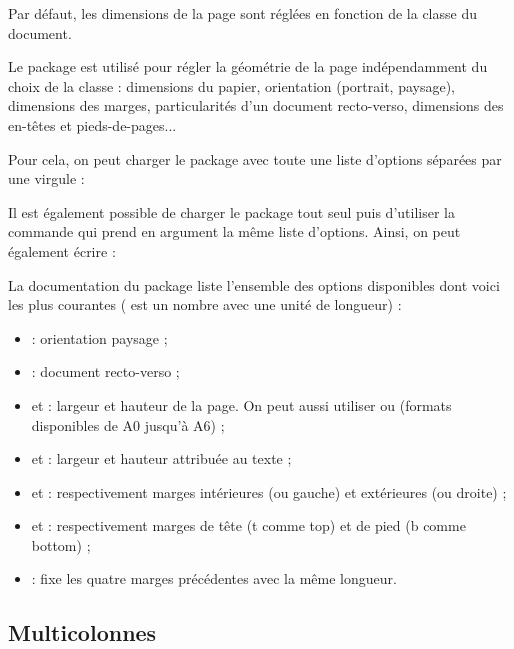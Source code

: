 Par défaut, les dimensions de la page sont réglées en fonction de la classe du document.\par
Le package  est utilisé pour régler la géométrie de la page indépendamment du choix de la classe : dimensions du papier, orientation (portrait, paysage), dimensions des marges, particularités d'un document recto-verso, dimensions des en-têtes et pieds-de-pages...

Pour cela, on peut charger le package avec toute une liste d'options séparées par une virgule :\par\medskip
{}\medskip

Il est également possible de charger le package tout seul puis d'utiliser la commande  qui prend en argument la même liste d'options. Ainsi, on peut également écrire :\par\medskip
{}\par
{}\medskip

La documentation du package  liste l'ensemble des options disponibles dont voici les plus courantes ( est un nombre avec une unité de longueur) :
\begin{itemize}
    \item {} : orientation paysage ;
    \item {} : document recto-verso ;
    \item {} et  : largeur et hauteur de la page. On peut aussi utiliser  ou  (formats disponibles de A0 jusqu'à A6) ;
    \item {} et  : largeur et hauteur attribuée au texte ;
    \item {} et  : respectivement marges intérieures (ou gauche) et extérieures (ou droite) ;
    \item {} et  : respectivement marges de tête (t comme top) et de pied (b comme bottom) ;
    \item {} : fixe les quatre marges précédentes avec la même longueur.
\end{itemize}

\subsection{Multicolonnes}

